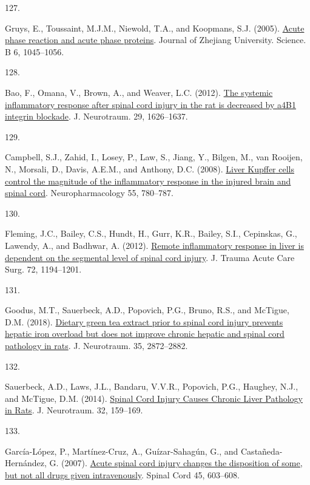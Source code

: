 \documentclass[
]{article}
\newlength{\cslhangindent}
\newlength{\csllabelwidth}
\newlength{\cslentryspacingunit} %
\newenvironment{CSLReferences}[2] %
 {%
  \setlength{\parindent}{0pt}
  \ifodd #1
  \let\oldpar\par
  \def\par{\hangindent=\cslhangindent\oldpar}
  \fi
  \setlength{\parskip}{#2\cslentryspacingunit}
 }%
 {}
\newcommand{\CSLLeftMargin}[1]{\parbox[t]{\csllabelwidth}{#1}}
\newcommand{\CSLRightInline}[1]{\parbox[t]{\linewidth - \csllabelwidth}{#1}\break}
\begin{document}
\begin{CSLReferences}{0}{0}
\leavevmode{}%
\CSLLeftMargin{127. }
\CSLRightInline{Gruys, E., Toussaint, M.J.M., Niewold, T.A., and Koopmans, S.J. (2005). \href{https://doi.org/10.1631/jzus.2005.B1045}{Acute phase reaction and acute phase proteins}. Journal of Zhejiang University. Science. B 6, 1045--1056.}

\leavevmode{}%
\CSLLeftMargin{128. }
\CSLRightInline{Bao, F., Omana, V., Brown, A., and Weaver, L.C. (2012). \href{https://doi.org/10.1089/neu.2011.2190}{The systemic inflammatory response after spinal cord injury in the rat is decreased by {a4B1} integrin blockade}. J. Neurotraum. 29, 1626--1637.}

\leavevmode{}%
\CSLLeftMargin{129. }
\CSLRightInline{Campbell, S.J., Zahid, I., Losey, P., Law, S., Jiang, Y., Bilgen, M., van Rooijen, N., Morsali, D., Davis, A.E.M., and Anthony, D.C. (2008). \href{https://doi.org/10.1016/j.neuropharm.2008.06.074}{Liver {Kupffer} cells control the magnitude of the inflammatory response in the injured brain and spinal cord}. Neuropharmacology 55, 780--787.}

\leavevmode{}%
\CSLLeftMargin{130. }
\CSLRightInline{Fleming, J.C., Bailey, C.S., Hundt, H., Gurr, K.R., Bailey, S.I., Cepinskas, G., Lawendy, A., and Badhwar, A. (2012). \href{https://doi.org/10.1097/ta.0b013e31824d68bd}{Remote inflammatory response in liver is dependent on the segmental level of spinal cord injury}. J. Trauma Acute Care Surg. 72, 1194--1201.}

\leavevmode{}%
\CSLLeftMargin{131. }
\CSLRightInline{Goodus, M.T., Sauerbeck, A.D., Popovich, P.G., Bruno, R.S., and McTigue, D.M. (2018). \href{https://doi.org/10.1089/neu.2018.5771}{Dietary green tea extract prior to spinal cord injury prevents hepatic iron overload but does not improve chronic hepatic and spinal cord pathology in rats}. J. Neurotraum. 35, 2872--2882.}

\leavevmode{}%
\CSLLeftMargin{132. }
\CSLRightInline{Sauerbeck, A.D., Laws, J.L., Bandaru, V.V.R., Popovich, P.G., Haughey, N.J., and McTigue, D.M. (2014). \href{https://doi.org/10.1089/neu.2014.3497}{Spinal {Cord Injury Causes Chronic Liver Pathology} in {Rats}}. J. Neurotraum. 32, 159--169.}

\leavevmode{}%
\CSLLeftMargin{133. }
\CSLRightInline{García-López, P., Martínez-Cruz, A., Guízar-Sahagún, G., and Castañeda-Hernández, G. (2007). \href{https://doi.org/10.1038/sj.sc.3102001}{Acute spinal cord injury changes the disposition of some, but not all drugs given intravenously}. Spinal Cord 45, 603--608.}


\end{CSLReferences}
\end{document}
